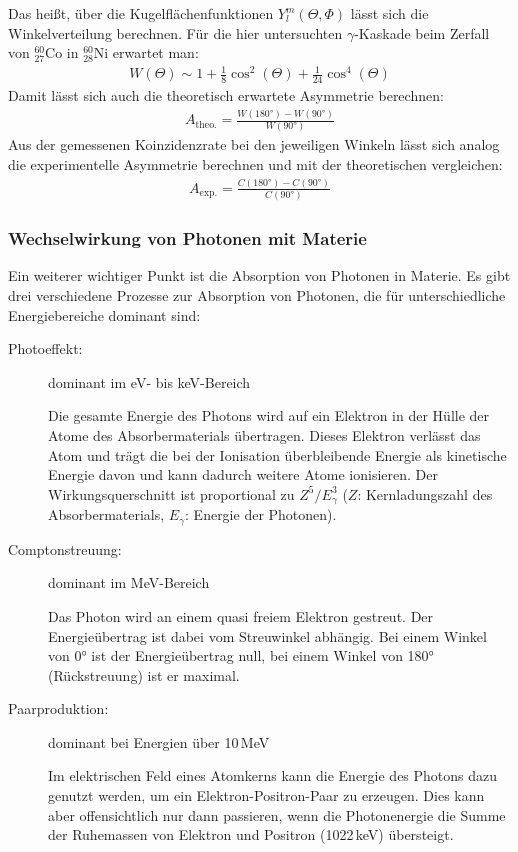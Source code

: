 Das heißt, über die Kugelflächenfunktionen $Y^m_l(\Theta,\Phi)$ lässt sich die Winkelverteilung berechnen. Für die hier untersuchten $\gamma$-Kaskade beim Zerfall von $^{60}_{27}$Co in $^{60}_{28}$Ni erwartet man:
\begin{align}
	W(\Theta)\sim 1+\frac{1}{8}\cos^2(\Theta)+\frac{1}{24}\cos^4(\Theta)
\end{align}
Damit lässt sich auch die theoretisch erwartete Asymmetrie berechnen:
\begin{align}
	A_\text{theo.}=\frac{W(180\text{°})-W(90\text{°})}{W(90\text{°})}
\end{align}
Aus der gemessenen Koinzidenzrate bei den jeweiligen Winkeln lässt sich analog die experimentelle Asymmetrie berechnen und mit der theoretischen vergleichen:
\begin{align}
A_\text{exp.}=\frac{C(180\text{°})-C(90\text{°})}{C(90\text{°})}
\end{align}
\subsubsection{Wechselwirkung von Photonen mit Materie}

Ein weiterer wichtiger Punkt ist die Absorption von Photonen in Materie. Es gibt drei verschiedene Prozesse zur Absorption von Photonen, die für unterschiedliche Energiebereiche dominant sind:

\begin{description}
	\item[Photoeffekt:]\hfill
	dominant im eV- bis keV-Bereich
	
	Die gesamte Energie des Photons wird auf ein Elektron in der Hülle der Atome des Absorbermaterials übertragen. Dieses Elektron verlässt das Atom und trägt die bei der Ionisation überbleibende Energie als kinetische Energie davon und kann dadurch weitere Atome ionisieren. Der Wirkungsquerschnitt ist proportional zu $Z^5/E_\gamma^3$ ($Z$: Kernladungszahl des Absorbermaterials, $E_\gamma$: Energie der Photonen).
	
	\item[Comptonstreuung:]\hfill 
	dominant im MeV-Bereich
	
	Das Photon wird an einem quasi freiem Elektron gestreut. Der Energieübertrag ist dabei vom Streuwinkel abhängig. Bei einem Winkel von 0° ist der Energieübertrag null, bei einem Winkel von 180° (Rückstreuung) ist er maximal.
	
	\item[Paarproduktion:]\hfill 
	dominant bei Energien über 10\,MeV
	
	Im elektrischen Feld eines Atomkerns  kann die Energie des Photons dazu genutzt werden, um ein Elektron-Positron-Paar zu erzeugen. Dies kann aber offensichtlich nur dann passieren, wenn die Photonenergie die Summe der Ruhemassen von Elektron und Positron (1022\,keV) übersteigt.
\end{description}

